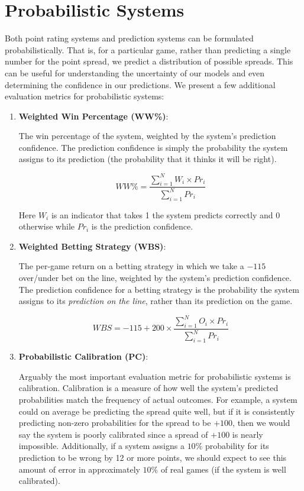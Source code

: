 \documentclass{report}
\begin{document}
\section{Probabilistic Systems}

Both point rating systems and prediction systems can be formulated probabilistically.
That is, for a particular game, rather than predicting a single number for the point spread, we predict a distribution of possible spreads.
This can be useful for understanding the uncertainty of our models and even determining the confidence in our predictions.
We present a few additional evaluation metrics for probabilistic systems:

\begin{enumerate}
    \item \textbf{Weighted Win Percentage (WW\%)}:

    The win percentage of the system, weighted by the system's prediction confidence.
    The prediction confidence is simply the probability the system assigns to its prediction (the probability that it thinks it will be right).

    \begin{equation}
        WW\% = \frac{\sum_{i=1}^{N}W_i \times Pr_i}{\sum_{i=1}^{N}Pr_i}
    \end{equation}

    Here $W_i$ is an indicator that takes 1 the system predicts correctly and 0 otherwise while $Pr_i$ is the prediction confidence.

    \item \textbf{Weighted Betting Strategy (WBS)}:
    
    The per-game return on a betting strategy in which we take a $-115$ over/under bet on the line, weighted by the system's prediction confidence.
    The prediction confidence for a betting strategy is the probability the system assigns to its \textit{prediction on the line}, rather than its prediction on the game.

    \begin{equation}
        WBS = -115 + 200\times\frac{\sum_{i=1}^{N}O_i\times Pr_i}{\sum_{i=1}^NPr_i}
    \end{equation}

    \item \textbf{Probabilistic Calibration (PC)}:
    
    Arguably the most important evaluation metric for probabilistic systems is calibration.
    Calibration is a measure of how well the system's predicted probabilities match the frequency of actual outcomes.
    For example, a system could on average be predicting the spread quite well, but if it is consistently predicting non-zero probabilities for the spread to be $+100$, then we would say the system is poorly calibrated since a spread of $+100$ is nearly impossible.
    Additionally, if a system assigns a $10\%$ probability for its prediction to be wrong by 12 or more points, we should expect to see this amount of error in approximately $10\%$ of real games (if the system is well calibrated).


\end{enumerate}
\end{document}
